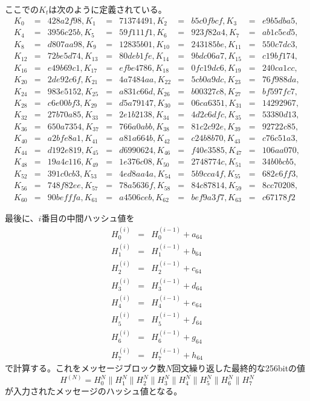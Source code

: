 \documentclass{thesis}
\begin{document}
\begin{enumerate}
ここでの$K_t$は次のように定義されている。
\begin{align*}
K_0&=&428a2f98, K_1&=&71374491, K_2&=&b5c0fbcf, K_3&=&e9b5dba5, \\
K_4&=&3956c25b, K_5&=&59f111f1, K_6&=&923f82a4, K_7&=&ab1c5ed5, \\
K_8&=&d807aa98, K_9&=&12835b01, K_{10}&=&243185be, K_{11}&=&550c7dc3, \\
K_{12}&=&72be5d74, K_{13}&=&80deb1fe, K_{14}&=&9bdc06a7, K_{15}&=&c19bf174, \\
K_{16}&=&e49b69c1, K_{17}&=&efbe4786, K_{18}&=&0fc19dc6, K_{19}&=&240ca1cc, \\
K_{20}&=&2de92c6f, K_{21}&=&4a7484aa, K_{22}&=&5cb0a9dc, K_{23}&=&76f988da, \\
K_{24}&=&983e5152, K_{25}&=&a831c66d, K_{26}&=&b00327c8, K_{27}&=&bf597fc7, \\
K_{28}&=&c6e00bf3, K_{29}&=&d5a79147, K_{30}&=&06ca6351, K_{31}&=&14292967, \\
K_{32}&=&27b70a85, K_{33}&=&2e1b2138, K_{34}&=&4d2c6dfc, K_{35}&=&53380d13, \\
K_{36}&=&650a7354, K_{37}&=&766a0abb, K_{38}&=&81c2c92e, K_{39}&=&92722c85, \\
K_{40}&=&a2bfe8a1, K_{41}&=&a81a664b, K_{42}&=&c24b8b70, K_{43}&=&c76c51a3, \\
K_{44}&=&d192e819, K_{45}&=&d6990624, K_{46}&=&f40e3585, K_{47}&=&106aa070, \\
K_{48}&=&19a4c116, K_{49}&=&1e376c08, K_{50}&=&2748774c, K_{51}&=&34b0bcb5, \\
K_{52}&=&391c0cb3, K_{53}&=&4ed8aa4a, K_{54}&=&5b9cca4f, K_{55}&=&682e6ff3, \\
K_{56}&=&748f82ee, K_{57}&=&78a5636f, K_{58}&=&84c87814, K_{59}&=&8cc70208, \\
K_{60}&=&90befffa, K_{61}&=&a4506ceb, K_{62}&=&bef9a3f7, K_{63}&=&c67178f2
\end{align*}

最後に、$i$番目の中間ハッシュ値を
\begin{eqnarray*}
H_0^{(i)} &=& H_0^{(i-1)} + a_{64} \\
H_1^{(i)} &=& H_1^{(i-1)} + b_{64} \\
H_2^{(i)} &=& H_2^{(i-1)} + c_{64} \\
H_3^{(i)} &=& H_3^{(i-1)} + d_{64} \\
H_4^{(i)} &=& H_4^{(i-1)} + e_{64} \\
H_5^{(i)} &=& H_5^{(i-1)} + f_{64} \\
H_6^{(i)} &=& H_6^{(i-1)} + g_{64} \\
H_7^{(i)} &=& H_7^{(i-1)} + h_{64}
\end{eqnarray*}
で計算する。これをメッセージブロック数$N$回文繰り返した最終的な256bitの値
\begin{equation*}
H^{(N)} = H_0^{N} \parallel H_1^{N} \parallel H_2^{N} \parallel H_3^{N} \parallel H_4^{N} \parallel H_5^{N} \parallel H_6^{N} \parallel H_7^{N}
\end{equation*}
が入力されたメッセージのハッシュ値となる。
\end{enumerate}
\end{document}
